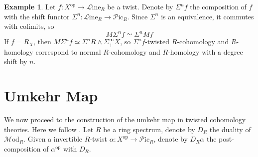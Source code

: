 \documentclass[a4paper]{book}
\newcommand{\lL}{\mathcal{L}}
\newcommand{\lM}{\mathcal{M}}
\newcommand{\lP}{\mathcal{P}}
\newcommand{\op}{\mathrm{op}}
\renewcommand{\Line}{\lL\mathrm{ine}} %
\newcommand{\Mod}{\lM\mathrm{od}} %
\newcommand{\Pic}{\lP\mathrm{ic}} %
\theoremstyle{definition}
\newtheorem{example}[equation]{Example}
\theoremstyle{remark}
\numberwithin{equation}{section}
\begin{document}
\begin{example}
	Let $f:X^{\op}\to\Line_R$ be a twist. Denote by $\Sigma^nf$ the composition of $f$ with the shift functor $\Sigma^n:\Line_R\to\Pic_R$. Since $\Sigma^n$ is an equivalence, it commutes with colimits, so $$M\Sigma^nf\simeq \Sigma^nMf$$If $f=R_X$, then $M\Sigma^nf\simeq \Sigma^nR\wedge\Sigma^\infty_+X$, so  $\Sigma^nf$-twisted $R$-cohomology and $R$-homology correspond to normal $R$-cohomology and $R$-homology with a degree shift by $n$. 
\end{example}

\section{Umkehr Map}
We now proceed to the construction of the umkehr map in twisted cohomology theories. Here we follow \cite{abg2018thom}. Let $R$ be a ring spectrum, denote by $D_R$ the duality of $\Mod_R$. Given a invertible $R$-twist $\alpha:X^{\op}\to\Pic_R$, denote by $D_R\alpha$ the post-composition of $\alpha^{\op}$ with $D_R$.
\end{document}
